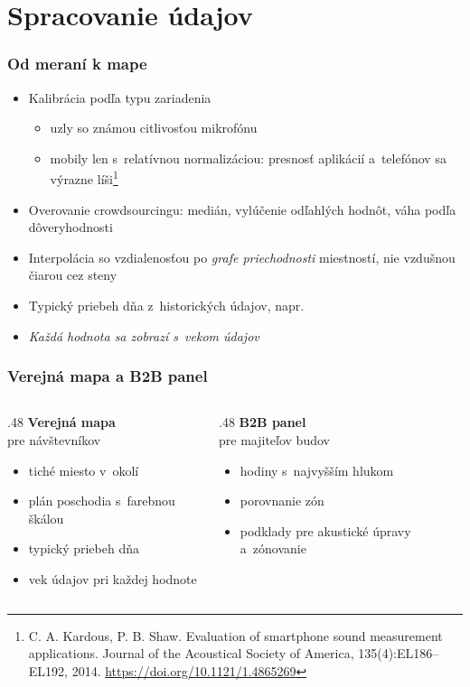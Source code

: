 \documentclass{beamer}
\newcommand{\footcite}[1]{\footnote{\tiny #1}}
\newcommand{\emp}[1]{\textit{\alert{#1}}}
\begin{document}
\section{Spracovanie údajov}

\begin{frame}[fragile=singleslide]\frametitle{Od meraní k mape}
\begin{itemize}
\item Kalibrácia podľa typu zariadenia
	\begin{itemize}
	\item uzly so známou citlivosťou mikrofónu
	\item mobily len s~relatívnou normalizáciou: presnosť aplikácií a~telefónov sa výrazne líši\footcite{C. A. Kardous, P. B. Shaw. Evaluation of smartphone sound measurement applications. Journal of the Acoustical Society of America, 135(4):EL186--EL192, 2014. \url{https://doi.org/10.1121/1.4865269}}
	\end{itemize}
\item Overovanie crowdsourcingu: medián, vylúčenie odľahlých hodnôt, váha podľa dôveryhodnosti
\item Interpolácia so vzdialenosťou po \emph{grafe priechodnosti} miestností, nie vzdušnou čiarou cez steny
\item Typický priebeh dňa z~historických údajov, napr. 
\item \emp{Každá hodnota sa zobrazí s~vekom údajov}
\end{itemize}
\end{frame}


\begin{frame}[fragile=singleslide]\frametitle{Verejná mapa a B2B panel}
\begin{columns}[T]
\begin{column}{.48\textwidth}
\textbf{Verejná mapa}\\[1mm]
{\small pre návštevníkov}
\begin{itemize}
\item tiché miesto v~okolí
\item plán poschodia s~farebnou škálou
\item typický priebeh dňa
\item vek údajov pri každej hodnote
\end{itemize}
\end{column}
\begin{column}{.48\textwidth}
\textbf{B2B panel}\\[1mm]
{\small pre majiteľov budov}
\begin{itemize}
\item hodiny s~najvyšším hlukom
\item porovnanie zón
\item podklady pre akustické úpravy a~zónovanie
\end{itemize}
\end{column}
\end{columns}
\end{frame}
\end{document}
